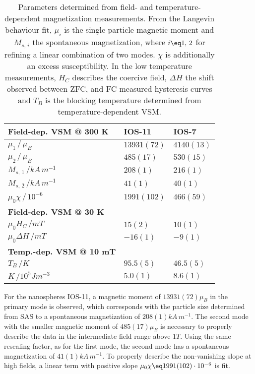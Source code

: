 \documentclass[\main/dresen_thesis.tex]{subfiles}
\begin{document}
  \begin{table}[!htbp]
    \centering
    \caption{\label{tab:looselyPackedNP:nanoparticle:vsm} Parameters determined from field- and temperature-dependent magnetization measurements. From the Langevin behaviour fit, $\mu_i$ is the single-particle magnetic moment and $M_{s,\,i}$ the spontaneous magnetization, where $i\eq 1,\,2$ for refining a linear combination of two modes. $\chi$ is additionally an excess susceptibility. In the low temperature measurements, $H_C$ describes the coercive field, $\Delta H$ the shift observed between ZFC, and FC measured hysteresis curves and $T_B$ is the blocking temperature determined from temperature-dependent VSM.}
    \begin{tabular}{ l | l | l }
      \rule{0pt}{2ex} \textbf{Field-dep. VSM @ 300 K} & IOS-11 & IOS-7 \\
      \hline
      \rule{0pt}{2ex} $\mu_1 \, / \, \mu_B$                     & $13931(72)$    & $4140(13)$\\
      \rule{0pt}{2ex} $\mu_2 \, / \, \mu_B$                     & $485(17) $     & $530(15)$ \\
      \rule{0pt}{2ex} $M_{s,\,1} \, /  \unit{kA\,m^{-1}}$       & $208(1)$       & $216(1)$  \\
      \rule{0pt}{2ex} $M_{s,\,2} \, /  \unit{kA\,m^{-1}}$       & $41(1)$        & $40(1)$   \\
      \rule{0pt}{2ex} $\mu_0 \chi \, / \, 10^{-6}$              & $1991(102)$    & $466(59)$ \\
      \hline
      \hline
      \rule{0pt}{2ex} \textbf{Field-dep. VSM @ 30 K} &  & \\
      \rule{0pt}{2ex} $\mu_0 H_C \, / \unit{mT}$                & $15(2)$        & $10(1)$ \\
      \rule{0pt}{2ex} $\mu_0 \Delta H \, / \unit{mT}$           & $-16(1)$       & $-9(1)$ \\
      \hline
      \hline
      \rule{0pt}{2ex} \textbf{Temp.-dep. VSM @ 10 mT} &  & \\
      \rule{0pt}{2ex} $T_B \, / \unit{K}$                       & $95.5(5)$      & $46.5(5)$ \\
      \rule{0pt}{2ex} $K \, / \unit{10^{5} J m^{-3}}$           & $5.0(1)$       & $8.6(1)$  \\
    \end{tabular}
  \end{table}

  For the nanospheres IOS-11, a magnetic moment of $13931(72) \mu_B$ in the primary mode is observed, which corresponds with the particle size determined from SAS to a spontaneous magnetization of $208(1) \unit{kA\,m^{-1}}$.
  The second mode with the smaller magnetic moment of $485(17) \mu_B$ is necessary to properly describe the data in the intermediate field range above $1 \unit{T}$.
  Using the same rescaling factor, as for the first mode, the second mode has a spontaneous magnetization of $41(1) \unit{kA\,m^{-1}}$.
  To properly describe the non-vanishing slope at high fields, a linear term with positive slope $\mu_0 \chi \eq 1991(102) \cdot 10^{-6}$ is fit.
\end{document}
